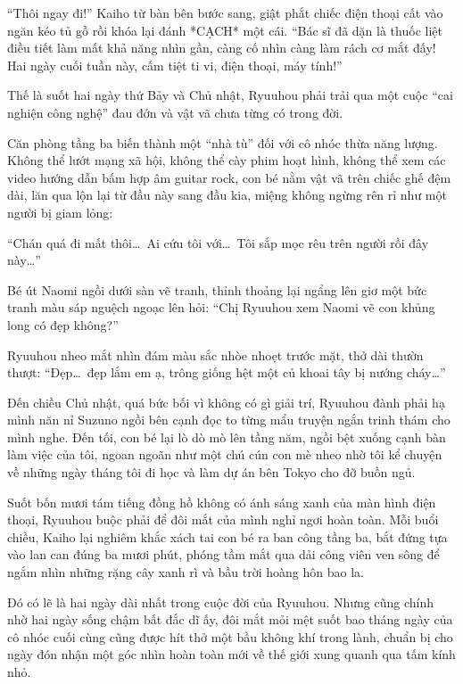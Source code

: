 \documentclass[../main.tex]{subfiles}
\begin{document}
``Thôi ngay đi!'' Kaiho từ bàn bên bước sang, giật phắt chiếc điện thoại cất vào ngăn kéo tủ gỗ rồi khóa lại đánh *CẠCH* một cái. ``Bác sĩ đã dặn là thuốc liệt điều tiết làm mất khả năng nhìn gần, càng cố nhìn càng làm rách cơ mắt đấy! Hai ngày cuối tuần này, cấm tiệt ti vi, điện thoại, máy tính!''

Thế là suốt hai ngày thứ Bảy và Chủ nhật, Ryuuhou phải trải qua một cuộc ``cai nghiện công nghệ'' đau đớn và vật vã chưa từng có trong đời.

Căn phòng tầng ba biến thành một ``nhà tù'' đối với cô nhóc thừa năng lượng. Không thể lướt mạng xã hội, không thể cày phim hoạt hình, không thể xem các video hướng dẫn bấm hợp âm guitar rock, con bé nằm vật vã trên chiếc ghế đệm dài, lăn qua lộn lại từ đầu này sang đầu kia, miệng không ngừng rên rỉ như một người bị giam lỏng:

``Chán quá đi mất thôi\dots\ Ai cứu tôi với\dots\ Tôi sắp mọc rêu trên người rồi đây này\dots''

Bé út Naomi ngồi dưới sàn vẽ tranh, thỉnh thoảng lại ngẩng lên giơ một bức tranh màu sáp nguệch ngoạc lên hỏi: ``Chị Ryuuhou xem Naomi vẽ con khủng long có đẹp không?''

Ryuuhou nheo mắt nhìn đám màu sắc nhòe nhoẹt trước mặt, thở dài thườn thượt: ``Đẹp\dots\ đẹp lắm em ạ, trông giống hệt một củ khoai tây bị nướng cháy\dots''

Đến chiều Chủ nhật, quá bức bối vì không có gì giải trí, Ryuuhou đành phải hạ mình năn nỉ Suzuno ngồi bên cạnh đọc to từng mẩu truyện ngắn trinh thám cho mình nghe. Đến tối, con bé lại lò dò mò lên tầng năm, ngồi bệt xuống cạnh bàn làm việc của tôi, ngoan ngoãn như một chú cún con mè nheo nhờ tôi kể chuyện về những ngày tháng tôi đi học và làm dự án bên Tokyo cho đỡ buồn ngủ.

Suốt bốn mươi tám tiếng đồng hồ không có ánh sáng xanh của màn hình điện thoại, Ryuuhou buộc phải để đôi mắt của mình nghỉ ngơi hoàn toàn. Mỗi buổi chiều, Kaiho lại nghiêm khắc xách tai con bé ra ban công tầng ba, bắt đứng tựa vào lan can đúng ba mươi phút, phóng tầm mắt qua dải công viên ven sông để ngắm nhìn những rặng cây xanh rì và bầu trời hoàng hôn bao la.

Đó có lẽ là hai ngày dài nhất trong cuộc đời của Ryuuhou. Nhưng cũng chính nhờ hai ngày sống chậm bất đắc dĩ ấy, đôi mắt mỏi mệt suốt bao tháng ngày của cô nhóc cuối cùng cũng được hít thở một bầu không khí trong lành, chuẩn bị cho ngày đón nhận một góc nhìn hoàn toàn mới về thế giới xung quanh qua tấm kính nhỏ.
\end{document}
